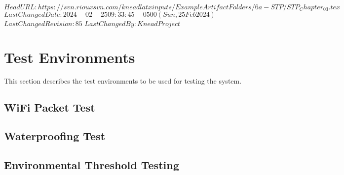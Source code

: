 \svnidlong
{$HeadURL: https://svn.riouxsvn.com/kneadlatxinputs/ExampleArtifactFolders/6a-STP/STP_Chapter_03.tex $}
{$LastChangedDate: 2024-02-25 09:33:45 -0500 (Sun, 25 Feb 2024) $}
{$LastChangedRevision: 85 $}
{$LastChangedBy: KneadProject $}


\chapter{Test Environments}
\label{loc:TestEnvironments}
% 

This section describes the test environments to be used for testing the system.

\section{WiFi Packet Test}
\label{loc:TestEnvironmentOne}
\newcommand{\TestEnvName}{WiFi Packet Test}%


\section{Waterproofing Test}
\label{loc:TestEnvironmentTwo}
\renewcommand{\TestEnvName}{Waterproofing Test}%


\section{Environmental Threshold Testing}
\label{loc:TestEnvironmentThree}
\renewcommand{\TestEnvName}{Environmental Threshold Test}%




